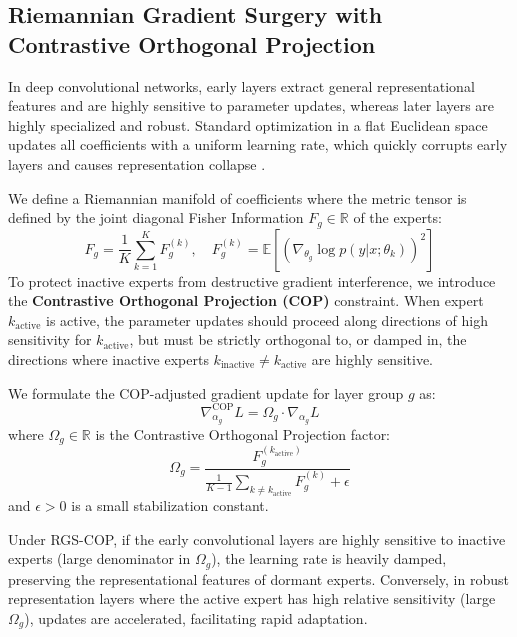 \documentclass{article}
\theoremstyle{plain}
\theoremstyle{definition}
\theoremstyle{remark}
\begin{document}
\subsection{Riemannian Gradient Surgery with Contrastive Orthogonal Projection}
In deep convolutional networks, early layers extract general representational features and are highly sensitive to parameter updates, whereas later layers are highly specialized and robust. Standard optimization in a flat Euclidean space updates all coefficients with a uniform learning rate, which quickly corrupts early layers and causes representation collapse \cite{Submission7Paper}.

We define a Riemannian manifold of coefficients where the metric tensor is defined by the joint diagonal Fisher Information $F_g \in \mathbb{R}$ of the experts:
\begin{equation}
    F_g = \frac{1}{K} \sum_{k=1}^K F^{(k)}_g, \quad F^{(k)}_g = \mathbb{E} \left[ \left( \nabla_{\theta_{g}} \log p(y|x; \theta_k) \right)^2 \right]
\end{equation}
To protect inactive experts from destructive gradient interference, we introduce the \textbf{Contrastive Orthogonal Projection (COP)} constraint. When expert $k_{\text{active}}$ is active, the parameter updates should proceed along directions of high sensitivity for $k_{\text{active}}$, but must be strictly orthogonal to, or damped in, the directions where inactive experts $k_{\text{inactive}} \neq k_{\text{active}}$ are highly sensitive.

We formulate the COP-adjusted gradient update for layer group $g$ as:
\begin{equation}
    \nabla^{\text{COP}}_{\alpha_{g}} L = \Omega_{g} \cdot \nabla_{\alpha_{g}} L
\end{equation}
where $\Omega_{g} \in \mathbb{R}$ is the Contrastive Orthogonal Projection factor:
\begin{equation}
    \Omega_{g} = \frac{F^{(k_{\text{active}})}_g}{\frac{1}{K-1} \sum_{k \neq k_{\text{active}}} F^{(k)}_g + \epsilon}
\end{equation}
and $\epsilon > 0$ is a small stabilization constant. 

Under RGS-COP, if the early convolutional layers are highly sensitive to inactive experts (large denominator in $\Omega_{g}$), the learning rate is heavily damped, preserving the representational features of dormant experts. Conversely, in robust representation layers where the active expert has high relative sensitivity (large $\Omega_{g}$), updates are accelerated, facilitating rapid adaptation.
\end{document}
